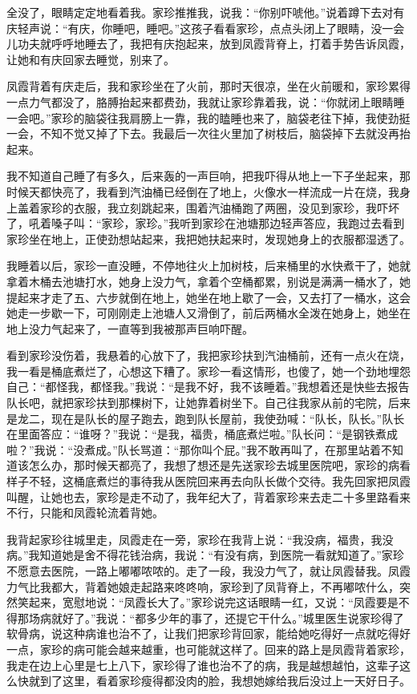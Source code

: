 \documentclass[12pt,UTF8]{ctexbook}
\begin{document}
全没了，眼睛定定地看着我。家珍推推我，说我：“你别吓唬他。”说着蹲下去对有庆轻声说：“有庆，你睡吧，睡吧。”这孩子看看家珍，点点头闭上了眼睛，没一会儿功夫就呼呼地睡去了，我把有庆抱起来，放到凤霞背脊上，打着手势告诉凤霞，让她和有庆回家去睡觉，别来了。

凤霞背着有庆走后，我和家珍坐在了火前，那时天很凉，坐在火前暖和，家珍累得一点力气都没了，胳膊抬起来都费劲，我就让家珍靠着我，说：“你就闭上眼睛睡一会吧。”家珍的脑袋往我肩膀上一靠，我的瞌睡也来了，脑袋老往下掉，我使劲挺一会，不知不觉又掉了下去。我最后一次往火里加了树枝后，脑袋掉下去就没再抬起来。

我不知道自己睡了有多久，后来轰的一声巨响，把我吓得从地上一下子坐起来，那时候天都快亮了，我看到汽油桶已经倒在了地上，火像水一样流成一片在烧，我身上盖着家珍的衣服，我立刻跳起来，围着汽油桶跑了两圈，没见到家珍，我吓坏了，吼着嗓子叫：“家珍，家珍。”我听到家珍在池塘那边轻声答应，我跑过去看到家珍坐在地上，正使劲想站起来，我把她扶起来时，发现她身上的衣服都湿透了。

我睡着以后，家珍一直没睡，不停地往火上加树枝，后来桶里的水快煮干了，她就拿着木桶去池塘打水，她身上没力气，拿着个空桶都累，别说是满满一桶水了，她提起来才走了五、六步就倒在地上，她坐在地上歇了一会，又去打了一桶水，这会她走一步歇一下，可刚刚走上池塘人又滑倒了，前后两桶水全泼在她身上，她坐在地上没力气起来了，一直等到我被那声巨响吓醒。

看到家珍没伤着，我悬着的心放下了，我把家珍扶到汽油桶前，还有一点火在烧，我一看是桶底煮烂了，心想这下糟了。家珍一看这情形，也傻了，她一个劲地埋怨自己：“都怪我，都怪我。”我说：“是我不好，我不该睡着。”我想着还是快些去报告队长吧，就把家珍扶到那棵树下，让她靠着树坐下。自己往我家从前的宅院，后来是龙二，现在是队长的屋子跑去，跑到队长屋前，我使劲喊：“队长，队长。”队长在里面答应：“谁呀？”我说：“是我，福贵，桶底煮烂啦。”队长问：“是钢铁煮成啦？”我说：“没煮成。”队长骂道：“那你叫个屁。”我不敢再叫了，在那里站着不知道该怎么办，那时候天都亮了，我想了想还是先送家珍去城里医院吧，家珍的病看样子不轻，这桶底煮烂的事待我从医院回来再去向队长做个交待。我先回家把凤霞叫醒，让她也去，家珍是走不动了，我年纪大了，背着家珍来去走二十多里路看来不行，只能和凤霞轮流着背她。

我背起家珍往城里走，凤霞走在一旁，家珍在我背上说：“我没病，福贵，我没病。”我知道她是舍不得花钱治病，我说：“有没有病，到医院一看就知道了。”家珍不愿意去医院，一路上嘟嘟哝哝的。走了一段，我没力气了，就让凤霞替我。凤霞力气比我都大，背着她娘走起路来咚咚响，家珍到了凤背脊上，不再嘟哝什么，突然笑起来，宽慰地说：“凤霞长大了。”家珍说完这话眼睛一红，又说：“凤霞要是不得那场病就好了。”我说：“都多少年的事了，还提它干什么。”城里医生说家珍得了软骨病，说这种病谁也治不了，让我们把家珍背回家，能给她吃得好一点就吃得好一点，家珍的病可能会越来越重，也可能就这样了。回来的路上是凤霞背着家珍，我走在边上心里是七上八下，家珍得了谁也治不了的病，我是越想越怕，这辈子这么快就到了这里，看着家珍瘦得都没肉的脸，我想她嫁给我后没过上一天好日子。
\end{document}

